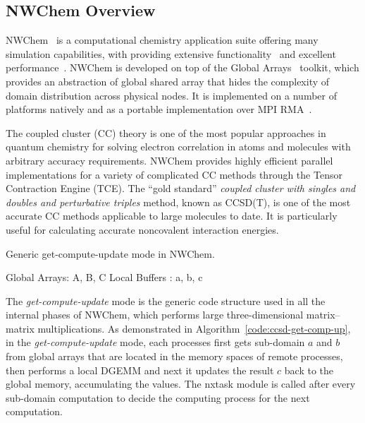 \subsection{NWChem Overview}\label{sec:eva-nwchem-overview}
NWChem~\cite{NWChem63} is a computational chemistry application suite
offering many simulation capabilities, with providing extensive
functionality~\cite{Hirata:2003:JPCA:TCE} and excellent
performance~\cite{Apra:2009:SC:NWChem}. NWChem is developed on top
of the Global Arrays~\cite{GA_SC94} toolkit, which provides an abstraction
of global shared array that hides the complexity of domain distribution
across physical nodes. It is implemented on a number of platforms
natively and as a portable implementation over MPI
RMA~\cite{dinan12:armci_mpi}.

The coupled cluster (CC) theory is one of the most popular approaches
in quantum chemistry for solving electron correlation in atoms and
molecules with arbitrary accuracy requirements. NWChem provides highly
efficient parallel implementations for a variety of complicated CC methods
through the Tensor Contraction Engine (TCE). The ``gold standard''
{\em coupled cluster with singles and doubles and perturbative triples}
method, known as CCSD(T), is one of the most accurate CC methods
applicable to large molecules to date. It is particularly useful for
calculating accurate noncovalent interaction energies.

\begin{algorithm}
\caption{Generic get-compute-update mode in NWChem.}
\label{code:ccsd-get-comp-up}
Global Arrays: A, B, C\;
Local Buffers : a, b, c\;
\end{algorithm}

The {\em get-compute-update} mode is the generic code structure used
in all the internal phases of NWChem, which performs large
three-dimensional matrix--matrix multiplications. As demonstrated in
Algorithm~\ref{code:ccsd-get-comp-up}, in the {\em get-compute-update}
mode, each processes first gets sub-domain $a$ and $b$ from global
arrays that are located in the memory spaces of remote processes, then
performs a local DGEMM and next it updates the result $c$ back to the
global memory, accumulating the values. The nxtask module is called
after every sub-domain computation to decide the computing process
for the next computation.

